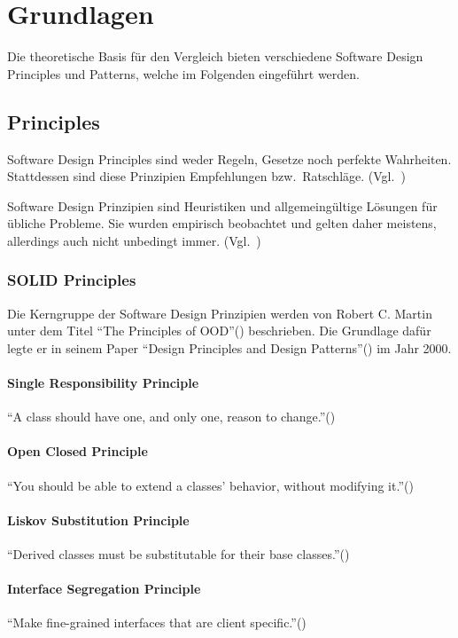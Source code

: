 \section{Grundlagen}
Die theoretische Basis für den Vergleich bieten verschiedene Software Design Principles und Patterns, welche
im Folgenden eingeführt werden.

\subsection{Principles}
Software Design Principles sind weder Regeln, Gesetze noch perfekte Wahrheiten.
Stattdessen sind diese Prinzipien Empfehlungen bzw.\ Ratschläge.
(Vgl.~\cite{getting-a-solid-start})

Software Design Prinzipien sind Heuristiken und allgemeingültige Lösungen für übliche Probleme.
Sie wurden empirisch beobachtet und gelten daher meistens, allerdings auch nicht unbedingt immer.
(Vgl.~\cite{getting-a-solid-start})

\subsubsection{SOLID Principles}
Die Kerngruppe der Software Design Prinzipien werden von Robert C. Martin unter dem Titel \enquote{The Principles of OOD}(\cite{solid}) beschrieben.
Die Grundlage dafür legte er in seinem Paper \enquote{Design Principles and Design Patterns}(\cite{design-principles-and-design-patterns}) im Jahr 2000.

\paragraph{Single Responsibility Principle}
\enquote{A class should have one, and only one, reason to change.}(\cite{solid})

\paragraph{Open Closed Principle}
\enquote{You should be able to extend a classes' behavior, without modifying it.}(\cite{solid})

\paragraph{Liskov Substitution Principle}
\enquote{Derived classes must be substitutable for their base classes.}(\cite{solid})

\paragraph{Interface Segregation Principle}
\enquote{Make fine-grained interfaces that are client specific.}(\cite{solid})

